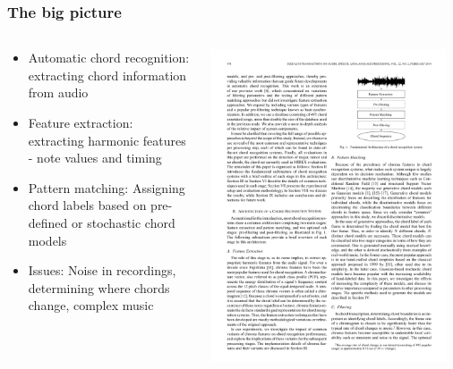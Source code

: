 \documentclass{beamer}
\begin{document}
\begin{frame}
  \frametitle{The big picture}
  
  \begin{columns}
  \begin{column}{0.6\textwidth}
  \begin{itemize}
  	\item Automatic chord recognition: extracting chord information from audio
	\item Feature extraction: extracting harmonic features - note values and timing  
	\item Pattern matching: Assigning chord labels based on pre-defined or stochastic chord models
	\item Issues: Noise in recordings, determining where chords change, complex music
  \end{itemize}
  \end{column}
  \begin{column}{0.4\textwidth}
   \includegraphics[width=0.95\textwidth]{fig3.pdf}
  \end{column}
  \end{columns}
\end{frame}
\end{document}
